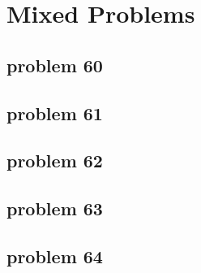 \section{Mixed Problems}

\subsection{problem 60}


\subsection{problem 61}


\subsection{problem 62}


\subsection{problem 63}


\subsection{problem 64}

